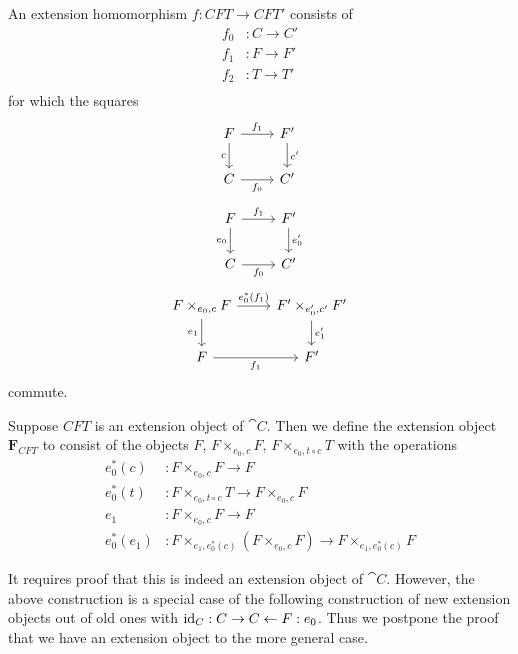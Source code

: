\begin{defn}
An extension homomorphism $f:CFT\to CFT'$ consists of
\begin{align*}
f_0 & : C\to C'\\
f_1 & : F\to F'\\
f_2 & : T\to T'\\
\end{align*}
for which the squares
\begin{equation*}
\begin{tikzcd}
F \ar{d}[swap]{c} \ar{r}{f_1} & F' \ar{d}{c'}\\
C \ar{r}[swap]{f_0} & C'
\end{tikzcd}
\end{equation*}
\begin{equation*}
\begin{tikzcd}
F \ar{d}[swap]{e_0} \ar{r}{f_1} & F' \ar{d}{e_0'}\\
C \ar{r}[swap]{f_0} & C'
\end{tikzcd}
\end{equation*}
\begin{equation*}
\begin{tikzcd}
F\times_{e_0,c} F \ar{d}[swap]{e_1} \ar{r}{e_0^\ast(f_1)} & F'\times_{e_0',c'}F' \ar{d}{e_1'}\\
F \ar{r}[swap]{f_1} & F'
\end{tikzcd}
\end{equation*}
commute.
\end{defn}

\begin{defn}
Suppose $CFT$ is an extension object of $\cat{C}$. Then we define the extension object
$\mathbf{F}_{CFT}$ to consist of the objects $F$, $F\times_{e_0,c} F$, $F\times_{e_0,t\circ c} T$
with the operations
\begin{align*}
e_0^\ast(c) & : F\times_{e_0,c} F\to F\\
e_0^\ast(t) & : F\times_{e_0,t\circ c} T\to F\times_{e_0,c} F\\
e_1 & : F\times_{e_0,c} F\to F\\
e_0^\ast(e_1) & : F\times_{e_1,e_0^\ast(c)}(F\times_{e_0,c} F)\to F\times_{e_1,e_0^\ast(c)} F
\end{align*}
\end{defn}

It requires proof that this is indeed an extension object of $\cat{C}$. However, the above
construction is a special case of the following construction of new extension objects out
of old ones with ${\mathrm{id}_{C}}:C\rightarrow C\leftarrow F:e_0$. Thus we postpone the proof
that we have an extension object to the more general case. 


